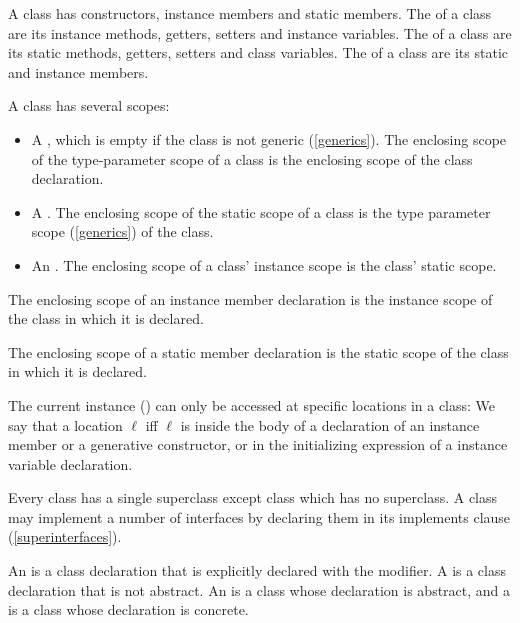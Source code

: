 \documentclass[makeidx]{article}
\begin{document}
\LMHash{}%
A class has constructors, instance members and static members.
The  of a class
are its instance methods, getters, setters and instance variables.
The  of a class
are its static methods, getters, setters and class variables.
The  of a class
are its static and instance members.

\LMHash{}%
A class has several scopes:
\begin{itemize}
\item A ,
  which is empty if the class is not generic (\ref{generics}).
The enclosing scope of the type-parameter scope of a class is the enclosing scope of the class declaration.
\item A .
The enclosing scope of the static scope of a class is the type parameter scope (\ref{generics}) of the class.
\item An .
The enclosing scope of a class' instance scope is the class' static scope.
\end{itemize}

\LMHash{}%
The enclosing scope of an instance member declaration is the instance scope of the class in which it is declared.

\LMHash{}%
The enclosing scope of a static member declaration is the static scope of the class in which it is declared.

\LMHash{}%
The current instance
()
can only be accessed at specific locations in a class:
We say that a location $\ell$
if{}f $\ell$ is inside the body of a declaration of
an instance member or a generative constructor,
or in the initializing expression of a \LATE{} instance variable declaration.


\LMHash{}%
Every class has a single superclass
except class  which has no superclass.
A class may implement a number of interfaces
by declaring them in its implements clause (\ref{superinterfaces}).

\LMHash{}%
An 
is a class declaration that is explicitly declared
with the \ABSTRACT{} modifier.
A 
is a class declaration that is not abstract.
An  is a class
whose declaration is abstract, and
a  is a class
whose declaration is concrete.
\end{document}
